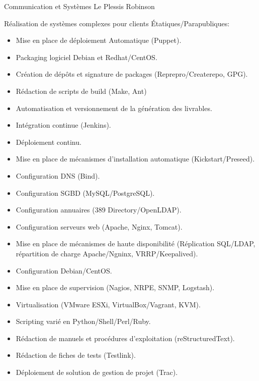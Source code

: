 \documentclass[10pt,a4paper,sans]{moderncv}        %
\begin{document}
        {Communication et Systèmes}
        {Le Plessis Robinson}
        {}
        {Réalisation de systèmes complexes pour clients Étatiques/Parapubliques:
            \begin{itemize}
            \item Mise en place de déploiement Automatique (Puppet).
            \item Packaging logiciel Debian et Redhat/CentOS.
            \item Création de dépôts et signature de packages (Reprepro/Createrepo, GPG).
            \item Rédaction de scripts de build (Make, Ant)
            \item Automatisation et versionnement de la génération des livrables.
            \item Intégration continue (Jenkins).
            \item Déploiement continu.
            \item Mise en place de mécanismes d'installation automatique (Kickstart/Preseed).
            \item Configuration DNS (Bind).
            \item Configuration SGBD (MySQL/PostgreSQL).
            \item Configuration annuaires (389 Directory/OpenLDAP).
            \item Configuration serveurs web (Apache, Nginx, Tomcat).
            \item Mise en place de mécanismes de haute disponibilité (Réplication SQL/LDAP, répartition de charge Apache/Ngninx, VRRP/Keepalived).
            \item Configuration Debian/CentOS.
            \item Mise en place de supervision (Nagios, NRPE, SNMP, Logstash).
            \item Virtualisation (VMware ESXi, VirtualBox/Vagrant, KVM).
            \item Scripting varié en Python/Shell/Perl/Ruby.
            \item Rédaction de manuels et procédures d'exploitation (reStructuredText).
            \item Rédaction de fiches de tests (Testlink).
            \item Déploiement de solution de gestion de projet (Trac).
            \end{itemize}
        }
\end{document}

